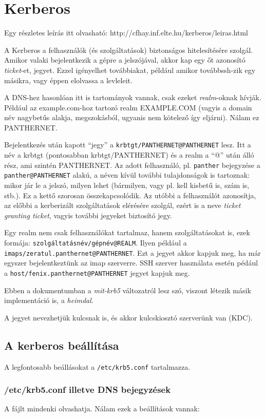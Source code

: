 \section{Kerberos}

Egy részletes leírás itt olvasható: http://cfhay.inf.elte.hu/kerberos/leiras.html

A Kerberos a felhasználók (és szolgáltatások) biztonságos hitelesítésére szolgál. Amikor valaki bejelentkezik a gépre
a jelszójával, akkor kap egy őt azonosító \emph{ticket}-et, jegyet. Ezzel igényelhet továbbiakat, például amikor
továbbssh-zik egy másikra, vagy éppen elolvassa a levleleit.

A DNS-hez hasonlóan itt is tartományok vannak, csak ezeket \emph{realm}-oknak hívják. Például az example.com-hoz
tartozó realm EXAMPLE.COM (vagyis a domain név nagybetűs alakja, megszokásból, ugyanis nem kötelező így
eljárni). Nálam ez PANTHERNET.

Bejelentkezés után kapott ``jegy'' a \texttt{krbtgt/PANTHERNET@PANTHERNET} lesz. Itt a név a krbtgt (pontosabban
krbtgt/PANTHERNET) és a realm a ``@'' után álló rész, ami szintén PANTHERNET. Az adott felhasználó,
pl. \texttt{panther} bejegyzése a \texttt{panther@PANTHERNET} alakú, a néven kívül további tulajdonságok is tartoznak:
mikor jár le a jelszó, milyen lehet (bármilyen, vagy pl. kell kisbetű is, szám is, stb.). Ez a kettő szorosan
összekapcsolódik. Az utóbbi a felhasználót azonosítja, az előbbi a kerberizált szolgáltatások elérésére szolgál, ezért
is a neve \emph{ticket granting ticket}, vagyis további jegyeket biztosító jegy.

Egy realm nem csak felhasználókat tartalmaz, hanem szolgáltatásokat is, ezek formája:
\texttt{szolgáltatásnév/gépnév@REALM}. Ilyen például a \texttt{imaps/zeratul.panthernet@PANTHERNET}. Ezt a jegyet
akkor kapjuk meg, ha már egyszer bejelentkeztünk az imap szerverre. SSH szerver használata esetén pédául a
\texttt{host/fenix.panthernet@PANTHERNET} jegyet kapjuk meg.

Ebben a dokumentumban a \emph{mit-krb5} változatról lesz szó, viszont létezik másik implementáció is, a \emph{heimdal}.

A jegyet nevezhetjük kulcsnak is, és akkor kulcskiosztó szerverünk van (KDC).
\subsection{A kerberos beállítása}
A legfontosabb beállásokat a \texttt{/etc/krb5.conf} tartalmazza.

\subsubsection{/etc/krb5.conf illetve DNS bejegyzések}
A fájlt mindenki olvashatja. Nálam ezek a beállítások vannak:


